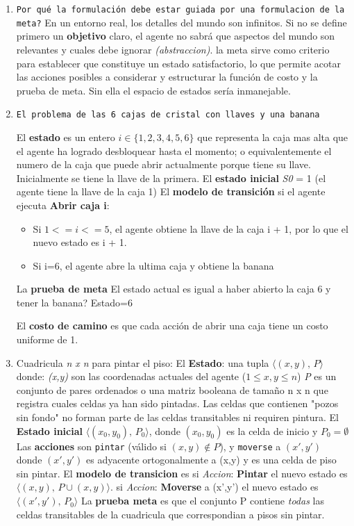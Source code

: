 \begin{enumerate}
	\item \texttt{Por qué la formulación debe estar guiada por una formulacion de la meta?} En un entorno real, los detalles del mundo son infinitos. Si no se define primero un \textbf{objetivo} claro, el agente no sabrá que aspectos del mundo son relevantes y cuales debe ignorar \textit{(abstraccion)}. la meta sirve como criterio para establecer que constituye un estado satisfactorio, lo que permite acotar las acciones posibles a considerar y estructurar la función de costo y la prueba de meta. Sin ella el espacio de estados sería inmanejable.
	\item \texttt{El problema de las 6 cajas de cristal con llaves y una banana}
	
	El \textbf{estado} es un entero  $i \in \{1,2,3,4,5,6\}$ que representa la caja mas alta que el agente ha logrado desbloquear hasta el momento; o equivalentemente el numero de la caja que puede abrir actualmente porque tiene su llave. Inicialmente se tiene la llave de la primera.
	El \textbf{estado inicial} \textit{S0} = 1 (el agente tiene la llave de la caja 1)
	El \textbf{modelo de transición} si el agente ejecuta \textbf{Abrir caja i}:
	\begin{itemize}
		\item Si $1 <= i <= 5$, el agente obtiene la llave de la caja i + 1, por lo que el nuevo estado es i + 1.
		\item Si i=6, el agente abre la ultima caja y obtiene la banana
	\end{itemize}
	
	La \textbf{prueba de meta} El estado actual es igual a haber abierto la caja 6 y tener la banana? Estado=6
	
	El \textbf{costo de camino} es que cada acción de abrir una caja tiene un costo uniforme de 1.
	
	\item Cuadricula \textit{n x n} para pintar el piso:
	El \textbf{Estado}: una tupla $\langle (x,y), \,P \rangle$ donde:
	\textit{(x,y)} son las coordenadas actuales del agente ($1 \leq x, y \leq n$)
	\textit{P} es un conjunto de pares ordenados o una matriz booleana de tamaño n x n que registra cuales celdas ya han sido pintadas. Las celdas que contienen "pozos sin fondo" no forman parte de las celdas transitables ni requiren pintura.
	El \textbf{Estado inicial} $\langle (x_0, y_0),\, P_0 \rangle$, donde \textit{$(x_0, y_0)$} es la celda de inicio y $P_0 = \emptyset$
	Las \textbf{acciones} son \texttt{pintar} (válido si $(x,y) \notin P$), y \texttt{moverse} a $(x',y')$ donde $(x',y')$ es adyacente ortogonalmente a (x,y) y es una celda de piso sin pintar.
	El \textbf{modelo de transicion} es si \textit{Accion}: \textbf{Pintar} el nuevo estado es $\langle (x,y), \,P \cup {(x,y)} \rangle$. si \textit{Accion}: \textbf{Moverse} a (x',y') el nuevo estado es $\langle (x', y'),\, P_0 \rangle$
	La \textbf{prueba meta} es que el conjunto P contiene \textit{todas} las celdas transitables de la cuadricula que correspondian a pisos sin pintar.
	
\end{enumerate}

